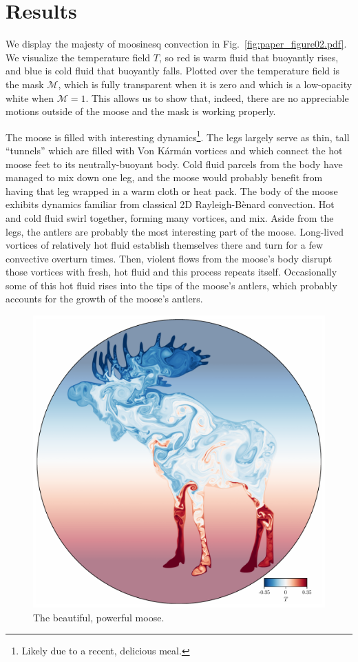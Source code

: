 \section{Results}
\label{sec:results}

We display the majesty of moosinesq convection in Fig.~\ref{fig:paper_figure02.pdf}.
We visualize the temperature field $T$, so red is warm fluid that buoyantly rises, and blue is cold fluid that buoyantly falls.
Plotted over the temperature field is the mask $\mathcal{M}$, which is fully transparent when it is zero and which is a low-opacity white when $\mathcal{M} = 1$.
This allows us to show that, indeed, there are no appreciable motions outside of the moose and the mask is working properly.

The moose is filled with interesting dynamics\footnote{Likely due to a recent, delicious meal.}.
The legs largely serve as thin, tall ``tunnels'' which are filled with Von K\'{a}rm\'{a}n vortices and which connect the hot moose feet to its neutrally-buoyant body.
Cold fluid parcels from the body have managed to mix down one leg, and the moose would probably benefit from having that leg wrapped in a warm cloth or heat pack.
The body of the moose exhibits dynamics familiar from classical 2D Rayleigh-B\`{e}nard convection.
Hot and cold fluid swirl together, forming many vortices, and mix.
Aside from the legs, the antlers are probably the most interesting part of the moose.
Long-lived vortices of relatively hot fluid establish themselves there and turn for a few convective overturn times.
Then, violent flows from the moose's body disrupt those vortices with fresh, hot fluid and this process repeats itself.
Occasionally some of this hot fluid rises into the tips of the moose's antlers, which probably accounts for the growth of the moose's antlers.

\begin{figure}[tp!]
\centering
    \includegraphics[width=\textwidth]{paper_figure02.pdf}
\caption{ The beautiful, powerful moose.
\label{fig:dynamics}
}
\end{figure}

